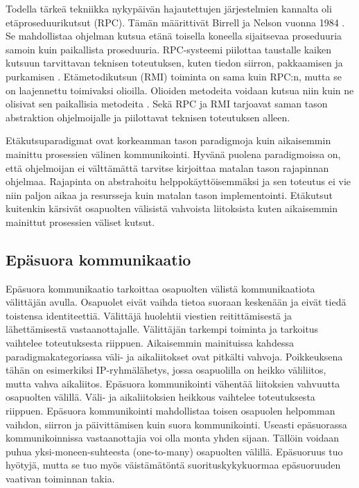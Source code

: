 Todella tärkeä tekniikka nykypäivän hajautettujen järjestelmien kannalta oli etäproseduurikutsut (RPC). Tämän määrittivät Birrell ja Nelson vuonna 1984 \cite{implemeting-remote-procedure-calls}. Se mahdollistaa ohjelman kutsua etänä toisella koneella sijaitsevaa proseduuria samoin kuin paikallista proseduuria. RPC-systeemi piilottaa taustalle kaiken kutsuun tarvittavan teknisen toteutuksen, kuten tiedon siirron, pakkaamisen ja purkamisen \cite[s.~195--196]{distributed-systems-concepts-and-design}. Etämetodikutsun (RMI) toiminta on sama kuin RPC:n, mutta se on laajennettu toimivaksi olioilla. Olioiden metodeita voidaan kutsua niin kuin ne olisivat sen paikallisia metodeita \cite[s.~204]{distributed-systems-concepts-and-design}. Sekä RPC ja RMI tarjoavat saman tason abstraktion ohjelmoijalle ja piilottavat teknisen toteutuksen alleen.

Etäkutsuparadigmat ovat korkeamman tason paradigmoja kuin aikaisemmin mainittu prosessien välinen kommunikointi. Hyvänä puolena paradigmoissa on, että ohjelmoijan ei välttämättä tarvitse kirjoittaa matalan tason rajapinnan ohjelmaa. Rajapinta on abstrahoitu helppokäyttöisemmäksi ja sen toteutus ei vie niin paljon aikaa ja resursseja kuin matalan tason implementointi. Etäkutsut kuitenkin kärsivät osapuolten välisistä vahvoista liitoksista kuten aikaisemmin mainittut prosessien väliset kutsut.


\subsection{Epäsuora kommunikaatio}
\label{ch:indirect-communication}
Epäsuora kommunikaatio tarkoittaa osapuolten välistä kommunikaatiota välittäjän avulla. Osapuolet eivät vaihda tietoa suoraan keskenään ja eivät tiedä toistensa identiteettiä. Välittäjä huolehtii viestien reitittämisestä ja lähettämisestä vastaanottajalle. Välittäjän tarkempi toiminta ja tarkoitus vaihtelee toteutuksesta riippuen. Aikaisemmin mainituissa kahdessa paradigmakategoriassa väli- ja aikaliitokset ovat pitkälti vahvoja. Poikkeuksena tähän on esimerkiksi IP-ryhmälähetys, jossa osapuolilla on heikko väliliitos, mutta vahva aikaliitos. Epäsuora kommunikointi vähentää liitoksien vahvuutta osapuolten välillä. Väli- ja aikaliitoksien heikkous vaihtelee toteutuksesta riippuen. Epäsuora kommunikointi mahdollistaa toisen osapuolen helpomman vaihdon, siirron ja päivittämisen kuin suora kommunikointi. Useasti epäsuorassa kommunikoinnissa vastaanottajia voi olla monta yhden sijaan. Tällöin voidaan puhua yksi-moneen-suhteesta (one-to-many) osapuolten välillä. Epäsuoruus tuo hyötyjä, mutta se tuo myös väistämätöntä suorituskykykuormaa epäsuoruuden vaativan toiminnan takia. \mbox{\cite[s.~230--231]{distributed-systems-concepts-and-design}}

